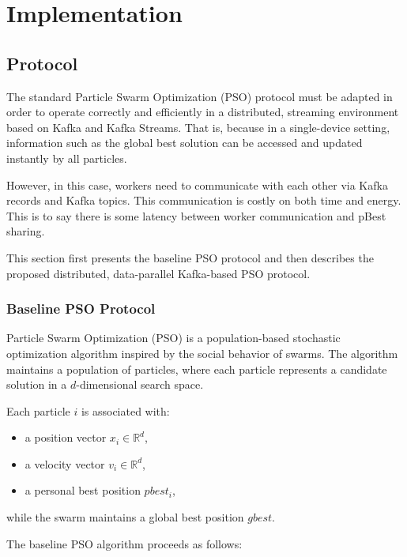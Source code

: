 \chapter{Implementation}

\section{Protocol}

The standard Particle Swarm Optimization (PSO) protocol must be adapted in order to operate correctly and efficiently in a distributed, streaming environment based on Kafka and Kafka Streams. That is, because in a single-device setting, information such as the global best solution can be accessed and updated instantly by all particles. 

However, in this case, workers need to communicate with each other via Kafka records and Kafka topics. This communication is costly on both time and energy. This is to say there is some latency between worker communication and pBest sharing.

This section first presents the baseline PSO protocol and then describes the proposed distributed, data-parallel Kafka-based PSO protocol.

\subsection{Baseline PSO Protocol}

Particle Swarm Optimization (PSO) is a population-based stochastic optimization algorithm inspired by the social behavior of swarms. The algorithm maintains a population of particles, where each particle represents a candidate solution in a $d$-dimensional search space.

Each particle $i$ is associated with:
\begin{itemize}
    \item a position vector $x_i \in \mathbb{R}^d$,
    \item a velocity vector $v_i \in \mathbb{R}^d$,
    \item a personal best position $pbest_i$,
\end{itemize}
while the swarm maintains a global best position $gbest$.

The baseline PSO algorithm proceeds as follows:

